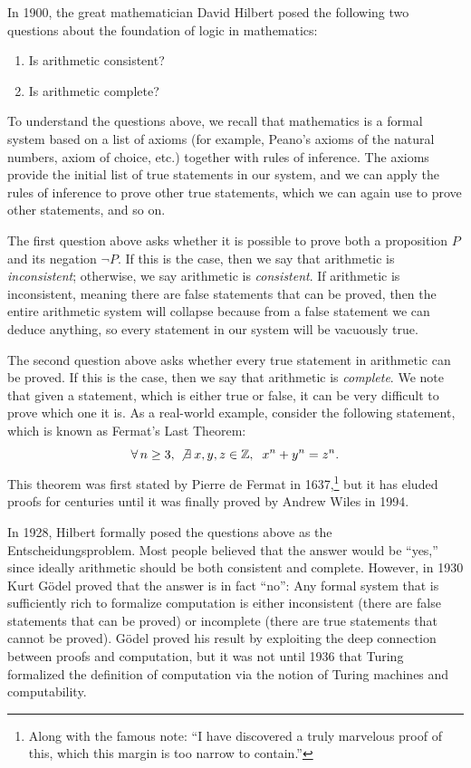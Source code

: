 \documentclass[11pt,fleqn]{article}
\begin{document}
In 1900, the great mathematician David Hilbert posed the following two questions about the foundation of logic in mathematics:
\begin{enumerate}
\vspace{-6pt}
  \item Is arithmetic consistent?
\vspace{-3pt}
  \item Is arithmetic complete?
\end{enumerate}

To understand the questions above, we recall that mathematics is a formal system based on a list of axioms (for example, Peano's axioms of the natural numbers, axiom of choice, etc.) together with rules of inference. The axioms provide the initial list of true statements in our system, and we can apply the rules of inference to prove other true statements, which we can again use to prove other statements, and so on.

The first question above asks whether it is possible to prove both a proposition $P$ and its negation $\neg P$. If this is the case, then we say that arithmetic is {\em inconsistent}; otherwise, we say arithmetic is {\em consistent}. If arithmetic is inconsistent, meaning there are false statements that can be proved, then the entire arithmetic system will collapse because from a false statement we can deduce anything, so every statement in our system will be vacuously true.

The second question above asks whether every true statement in arithmetic can be proved. If this is the case, then we say that arithmetic is {\em complete}. We note that given a statement, which is either true or false, it can be very difficult to prove which one it is. As a real-world example, consider the following statement, which is known as Fermat's Last Theorem:
$$\forall \, n \ge 3, ~ \not\exists \: x,y,z \in \mathbb{Z}, \:~ x^n + y^n = z^n.$$
This theorem was first stated by Pierre de Fermat in 1637,\footnote{Along with the famous note: ``I have discovered a truly marvelous proof of this, which this margin is too narrow to contain.''} but it has eluded proofs for centuries until it was finally proved by Andrew Wiles in 1994.

In 1928, Hilbert formally posed the questions above as the Entscheidungsproblem. Most people believed that the answer would be ``yes,'' since ideally arithmetic should be both consistent and complete. However, in 1930 Kurt G\"odel proved that the answer is in fact ``no'': Any formal system that is sufficiently rich to formalize computation is either inconsistent (there are false statements that can be proved) or incomplete (there are true statements that cannot be proved). G\"odel proved his result by exploiting the deep connection between proofs and computation, but it was not until 1936 that Turing formalized the definition of computation via the notion of Turing machines and computability.
\end{document}
